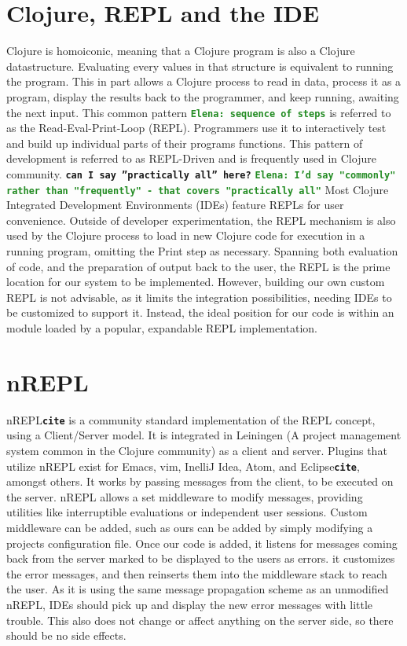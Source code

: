 \documentclass[12pt]{article}
\newcommand{\comment}[1]{{\bf \tt  {#1}}}
\newcommand{\emcomment}[1]{\textcolor{ForestGreen}{\comment{Elena: {#1}}}}
\begin{document}
\section{Clojure, REPL and the IDE}
Clojure is homoiconic, meaning that a Clojure program is also a Clojure datastructure.
 Evaluating every values in that structure is
equivalent to running the program.
This in part allows a Clojure process to read in data, process it as a program, display the results
 back to the programmer, and keep running, awaiting the next input.
 This common pattern \emcomment{sequence of steps} is referred to
as the Read-Eval-Print-Loop (REPL). Programmers use it to interactively test and build up
individual parts of their programs functions. This pattern of development is
referred to as REPL-Driven and is frequently used in Clojure community.
\comment{can I say ''practically all'' here?}
\emcomment{I'd say "commonly" rather than "frequently" - that covers "practically all"}
 Most Clojure Integrated Development Environments (IDEs) feature REPLs for
 user convenience. Outside of developer experimentation, the REPL mechanism is also used
by the Clojure process to load in new Clojure code for execution in a running program,
omitting the Print step as necessary.
Spanning both evaluation of code, and the preparation of output back to the user,
the REPL is the prime location for our system to be implemented.
However, building our own custom REPL is not advisable, as it limits the
integration possibilities, needing IDEs to be customized to support it.
Instead, the ideal position for our code is within an module loaded
by a popular, expandable REPL implementation.

\section{nREPL}
nREPL\comment{cite} is a community standard implementation of the REPL concept,
 using a Client/Server model. It is integrated in Leiningen
 (A project management system common in the Clojure community) as a client and server.
 Plugins that utilize nREPL exist for Emacs, vim, InelliJ Idea, Atom, and Eclipse\comment{cite}, amongst others.
It works by passing messages from the client, to be executed on the server.
nREPL allows a set middleware to modify messages, providing utilities
like interruptible evaluations or independent user sessions.
Custom middleware can be added, such as ours can be added by simply
modifying a projects configuration file. Once our code is added,
it listens for messages coming back from the server
marked to be displayed to the users as errors.
it customizes the error messages, and then reinserts them into the middleware stack
to reach the user. As it is using the same message propagation scheme as an unmodified nREPL,
IDEs should pick up and display the new error messages with little trouble.
This also does not change or affect anything on the server side, so there should
be no side effects.
\end{document}
